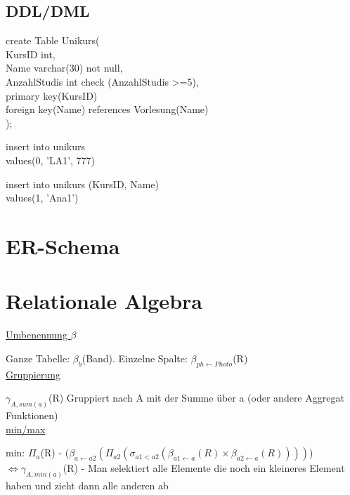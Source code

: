 \documentclass[12pt,a4paper]{article} %
\begin{document}
\subsection{DDL/DML}
create Table Unikurs( \\
KursID int, \\
Name varchar(30) not null, \\
AnzahlStudis int check (AnzahlStudis >=5), \\
primary key(KursID) \\
foreign key(Name) references Vorlesung(Name)\\
);

insert into unikurs \\
values(0, 'LA1', 777)

insert into unikurs (KursID, Name) \\
values(1, 'Ana1')

\section{ER-Schema}



\section{Relationale Algebra}
\underline{Umbenennung $\beta$}

Ganze Tabelle: $\beta_b$(Band). Einzelne Spalte: $\beta_{ph \leftarrow Photo}$(R)\\
\underline{Gruppierung}

$\gamma_{A, sum(a)}$(R) Gruppiert nach A mit der Summe über a (oder andere Aggregat Funktionen)\\
\underline{min/max}

min: $\varPi_a$(R) - ($\beta_{a \leftarrow a2}(\varPi_{a2}(\sigma_{a1 < a2}(\beta_{a1 \leftarrow a}(R) \times \beta_{a2 \leftarrow a}(R))))$) $\Leftrightarrow \gamma_{A, min(a)}$(R) - Man selektiert alle Elemente die noch ein kleineres Element haben und zieht dann alle anderen ab
\end{document}
